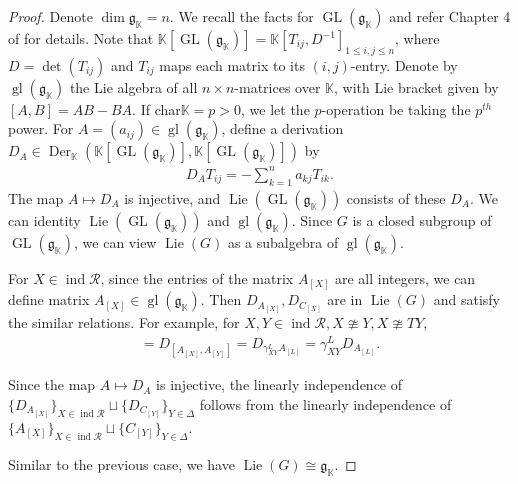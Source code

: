 \documentclass[12pt]{amsart}
\begin{document}
\begin{proof}
Denote $\operatorname{dim}\mathfrak{g}_{\mathbb{K}} = n$. We recall the facts for $\operatorname{GL}(\mathfrak{g}_{\mathbb{K}})$ and refer Chapter 4 of \cite{Springer} for details.
 Note that $\mathbb{K}[\operatorname{GL}(\mathfrak{g}_{\mathbb{K}})]=\mathbb{K}[T_{ij},D^{-1}]_{1\leq i,j \leq n}$, where $D=\operatorname{det}(T_{ij})$ and $T_{ij}$ maps each matrix to its $(i,j)$-entry.
Denote by $\operatorname{gl}(\mathfrak{g}_{\mathbb{K}})$ the Lie algebra of all $n\times n$-matrices over $\mathbb{K}$, with Lie bracket given by $[A,B]=AB-BA$.
If char$\mathbb{K}=p>0$, we let the $p$-operation be taking the $p^{th}$ power.
For $A=(a_{ij})\in \operatorname{gl}(\mathfrak{g}_{\mathbb{K}})$, define a derivation $D_A\in \operatorname{Der}_{\mathbb{K}}(\mathbb{K}[\operatorname{GL}(\mathfrak{g}_{\mathbb{K}})],\mathbb{K}[\operatorname{GL}(\mathfrak{g}_{\mathbb{K}})])$ by 
\begin{align*}
    D_A T_{ij} = -\sum\limits_{k=1}^n a_{kj}T_{ik}.
\end{align*}
The map $A \mapsto D_A$ is injective, and $\operatorname{Lie}(\operatorname{GL}(\mathfrak{g}_{\mathbb{K}}))$ consists of these $D_A$. 
We can identity $\operatorname{Lie}(\operatorname{GL}(\mathfrak{g}_{\mathbb{K}}))$ and $\operatorname{gl}(\mathfrak{g}_{\mathbb{K}})$.
Since $G$ is a closed subgroup of $\operatorname{GL}(\mathfrak{g}_{\mathbb{K}})$, we can view $\operatorname{Lie}(G)$ as a subalgebra of $\operatorname{gl}(\mathfrak{g}_{\mathbb{K}})$.

For $X\in \operatorname{ind}\mathcal{R}$, since the entries of the matrix $A_{[X]}$ are all integers, we can define matrix $A_{[X]}\in \operatorname{gl}(\mathfrak{g}_{\mathbb{K}})$.    
Then $D_{A_{[X]}}, D_{C_{[X]}}$ are in $\operatorname{Lie}(G)$ and satisfy the similar relations. 
For example, for $X,Y\in \operatorname{ind}\mathcal{R}, X\ncong Y,X\ncong TY$, 
\begin{align*}
    [D_{A_{[X]}},D_{A_{[Y]}}]=D_{[A_{[X]},A_{[Y]}]}=D_{\gamma_{XY}^L A_{[L]}}= \gamma_{XY}^L D_{A_{[L]}}.
\end{align*} 

Since the map $A \mapsto D_A$ is injective, the linearly independence of $\{D_{A_{[X]}}\}_{X\in \operatorname{ind}\mathcal{R}} \sqcup \{ D_{C_{[Y]}} \}_{Y\in \Delta}$ follows from the linearly independence of $\{A_{[X]}\}_{X\in \operatorname{ind}\mathcal{R}} \sqcup \{ C_{[Y]} \}_{Y\in \Delta}$.

Similar to the previous case, we have $\operatorname{Lie}(G) \cong \mathfrak{g}_{\mathbb{K}}$. 
\end{proof}
\end{document}
